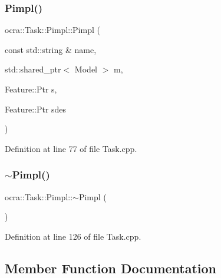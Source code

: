 \subsubsection{\texorpdfstring{Pimpl()}{Pimpl()}}
{\footnotesize\ttfamily ocra\+::\+Task\+::\+Pimpl\+::\+Pimpl (\begin{DoxyParamCaption}\item[{const std\+::string \&}]{name,  }\item[{std\+::shared\+\_\+ptr$<$ Model $>$}]{m,  }\item[{Feature\+::\+Ptr}]{s,  }\item[{Feature\+::\+Ptr}]{sdes }\end{DoxyParamCaption})\hspace{0.3cm}{\ttfamily [inline]}}



Definition at line 77 of file Task.\+cpp.

\hypertarget{structocra_1_1Task_1_1Pimpl_ae00df5386f25d40f820ef4bc1296ea4a}{}\label{structocra_1_1Task_1_1Pimpl_ae00df5386f25d40f820ef4bc1296ea4a} 
\subsubsection{\texorpdfstring{$\sim$\+Pimpl()}{~Pimpl()}}
{\footnotesize\ttfamily ocra\+::\+Task\+::\+Pimpl\+::$\sim$\+Pimpl (\begin{DoxyParamCaption}{ }\end{DoxyParamCaption})\hspace{0.3cm}{\ttfamily [inline]}}



Definition at line 126 of file Task.\+cpp.



\subsection{Member Function Documentation}
\hypertarget{structocra_1_1Task_1_1Pimpl_aabf390e84dff086a53ea876fad5755c5}{}\label{structocra_1_1Task_1_1Pimpl_aabf390e84dff086a53ea876fad5755c5} 

